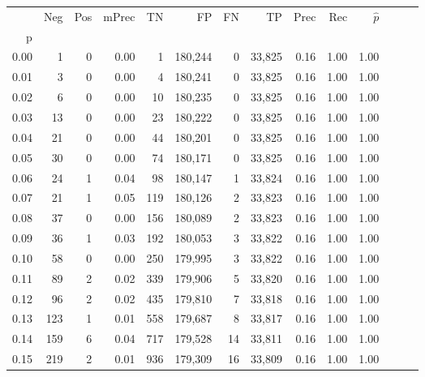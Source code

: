 \begin{tabular}{rrrrrrrrrrrrrr}
\toprule
{} &    Neg &    Pos & mPrec &       TN &       FP &      FN &      TP &  Prec &   Rec & $\hat{p}$ \\
p    &        &        &       &          &          &         &         &       &       &           \\
\midrule
0.00 &      1 &      0 &  0.00 &        1 &  180,244 &       0 &  33,825 &  0.16 &  1.00 &      1.00 \\
0.01 &      3 &      0 &  0.00 &        4 &  180,241 &       0 &  33,825 &  0.16 &  1.00 &      1.00 \\
0.02 &      6 &      0 &  0.00 &       10 &  180,235 &       0 &  33,825 &  0.16 &  1.00 &      1.00 \\
0.03 &     13 &      0 &  0.00 &       23 &  180,222 &       0 &  33,825 &  0.16 &  1.00 &      1.00 \\
0.04 &     21 &      0 &  0.00 &       44 &  180,201 &       0 &  33,825 &  0.16 &  1.00 &      1.00 \\
0.05 &     30 &      0 &  0.00 &       74 &  180,171 &       0 &  33,825 &  0.16 &  1.00 &      1.00 \\
0.06 &     24 &      1 &  0.04 &       98 &  180,147 &       1 &  33,824 &  0.16 &  1.00 &      1.00 \\
0.07 &     21 &      1 &  0.05 &      119 &  180,126 &       2 &  33,823 &  0.16 &  1.00 &      1.00 \\
0.08 &     37 &      0 &  0.00 &      156 &  180,089 &       2 &  33,823 &  0.16 &  1.00 &      1.00 \\
0.09 &     36 &      1 &  0.03 &      192 &  180,053 &       3 &  33,822 &  0.16 &  1.00 &      1.00 \\
0.10 &     58 &      0 &  0.00 &      250 &  179,995 &       3 &  33,822 &  0.16 &  1.00 &      1.00 \\
0.11 &     89 &      2 &  0.02 &      339 &  179,906 &       5 &  33,820 &  0.16 &  1.00 &      1.00 \\
0.12 &     96 &      2 &  0.02 &      435 &  179,810 &       7 &  33,818 &  0.16 &  1.00 &      1.00 \\
0.13 &    123 &      1 &  0.01 &      558 &  179,687 &       8 &  33,817 &  0.16 &  1.00 &      1.00 \\
0.14 &    159 &      6 &  0.04 &      717 &  179,528 &      14 &  33,811 &  0.16 &  1.00 &      1.00 \\
0.15 &    219 &      2 &  0.01 &      936 &  179,309 &      16 &  33,809 &  0.16 &  1.00 &      1.00 \\

\end{tabular}
